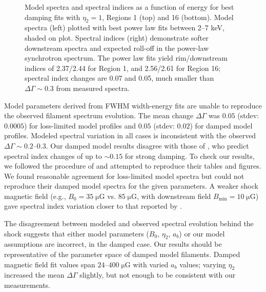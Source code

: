 \documentclass[iop, apj, numberedappendix]{emulateapj}
\newcommand*{\mt}{\mathrm}
\newcommand*{\unit}[1]{\;\mt{#1}}  %
\newcommand*{\muG}{\unit{\mu G}}
\begin{document}
\begin{figure}[h]
    \centering
    \iftoggle{manuscript}{
        \texttt{[image: figures/plt-specvar-1.pdf]} \\
        \texttt{[image: figures/plt-specvar-16.pdf]}
    }{
        \plotone{figures/plt-specvar-1.pdf} \\
        \plotone{figures/plt-specvar-16.pdf}
    }
    \caption{Model spectra and spectral indices as a function of energy for
    best damping fits with $\eta_2 = 1$, Regions 1 (top) and 16 (bottom).
    Model spectra (left) plotted with best power law fits between 2--7 keV,
    shaded on plot.  Spectral indices (right) demonstrate softer downstream
    spectra and expected roll-off in the power-law synchrotron spectrum.
    The power law fits yield rim/downstream indices of 2.37/2.44 for Region 1,
    and 2.56/2.61 for Region 16; spectral index changes are 0.07 and 0.05, much
    smaller than $\Delta\Gamma \sim 0.3$ from measured spectra.
    \label{fig:specvar}}
\end{figure}

Model parameters derived from FWHM width-energy fits are unable to reproduce
the observed filament spectrum evolution.  The mean change $\Delta\Gamma$ was
$0.05$ (stdev: $0.0005$) for loss-limited model profiles and $0.05$ (stdev:
$0.02$) for damped model profiles.  Modeled spectral variation in all cases is
inconsistent with the observed $\Delta\Gamma \sim 0.2$--$0.3$.
Our damped model results disagree with those of \citet[][Fig.~4]{rettig2012},
who predict spectral index changes of up to $\sim 0.15$ for strong damping.  To
check our results, we followed the procedure of \citet{rettig2012} and
attempted to reproduce their tables and figures.  We found reasonable agreement
for loss-limited model spectra but could not reproduce their damped model
spectra for the given parameters.  A weaker shock magnetic field (e.g., $B_0 =
35 \muG$ vs. $85 \muG$, with downstream field $B_{\mt{min}} = 10 \muG$) gave
spectral index variation closer to that reported by \citet{rettig2012}.

The disagreement between modeled and observed spectral evolution behind the
shock suggests that either model parameters ($B_0$, $\eta_2$, $a_b$) or our
model assumptions are incorrect, in the damped case.  Our results should be
representative of the parameter space of damped model filaments.  Damped
magnetic field fit values span $24$--$400 \muG$ with varied $a_b$ values;
varying $\eta_2$ increased the mean $\Delta\Gamma$ slightly, but not enough to
be consistent with our measurements.
\end{document}

